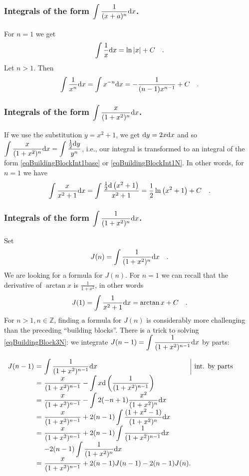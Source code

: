 \documentclass[12pt]{book}
\renewcommand{\Arctan}{\arctan}
\begin{document}
\subsubsection{Integrals of the form $\displaystyle\int \frac{1}{(x+a)^n}{\normalfont \text{d}} x$.}
For $n=1$ we get
\begin{equation}\label{eqBuildingBlockInt1base}
\int \frac{1}{x}{\normalfont \text{d}} x=\ln |x| +C\quad .
\end{equation}
Let $n> 1$. Then
\begin{equation}\label{eqBuildingBlockInt1N}
\int \frac{1}{x^n}{\normalfont \text{d}} x=\int x^{-n}{\normalfont \text{d}} x= -\frac{1}{(n-1)x^{n-1}}+C \quad .
\end{equation}
\subsubsection{Integrals of the form $\displaystyle\int \frac{x}{(1+x ^2)^n} {\normalfont \text{d}} x $.}
If we use the substitution $y=x^2+1$, we get ${\normalfont \text{d}} y=2x{\normalfont \text{d}} x $ and so $\displaystyle \int \frac{x}{(1+x ^2)^n} {\normalfont \text{d}} x = \displaystyle\int \frac{\frac12 {\normalfont \text{d}} y}{y^n} $, i.e., our integral is transformed to an integral of the form \eqref{eqBuildingBlockInt1base} or  \eqref{eqBuildingBlockInt1N}. In other words, for $n=1$ we have
\[
\int \frac{x}{x^2+1}{\normalfont \text{d}} x= \int \frac{\frac{1}2 {\normalfont \text{d}}\left(x^2+1\right)}{x^2+1}= \frac{1}{2}\ln \left(x^2+1\right) +C\quad .
\]
\subsubsection {Integrals of the form $\displaystyle\int \frac{1}{(1+x ^2)^n} {\normalfont \text{d}} x $.}
Set 
\begin{equation}\label{eqBuildingBlock3N}
J(n)=\int \frac{1}{(1+x ^2)^n}{\normalfont \text{d}} x\quad .
\end{equation}
We are looking for a formula for $J(n)$. For $n=1$ we can recall that the derivative of $\Arctan x$ is $\displaystyle\frac{1}{1+x^2}$, in other words
\[
J(1)=\int \frac{1}{x^2+1}\diff x= \Arctan x+C\quad .
\]
For $n>1, n\in \mathbb Z$, finding a formula for $J(n)$ is considerably more challenging than the preceding ``building blocks''. There is a trick to solving \eqref{eqBuildingBlock3N}: we integrate $\displaystyle J(n-1)= \int \frac{1}{(1+x ^2)^{n-1}}{\normalfont \text{d}} x$ by parts:

$
\begin{array}{r@{~}c@{~}l@{}l@{}|l}
J(n-1)&=&\displaystyle \int \frac{1}{(1+x ^2)^{n-1}}\diff x &&\text{int. by parts}\\
&=&\displaystyle \frac{x}{(1+x ^2)^{n-1}}-\int x \diff \left(\frac{1}{(1+x ^2)^{ n - 1 } } \right)\\
&=&\displaystyle\frac{x}{(1+x ^2)^{n-1}}- \int 2(-n+1)\frac{x^2}{(1+x^2)^n}\diff x\\
&=&\displaystyle\frac{x}{(1+x ^2)^{n-1}}+2(n-1) \int \frac{(1+x^2-1)}{(1+x^2)^n}\diff x\\
&=&\displaystyle\frac{x}{(1+x ^2)^{n-1}} +2(n-1)\int \frac{1}{(1+x^2)^{n-1}}\diff x \\&&\displaystyle -2(n-1) \int \frac{1}{(1+x^2)^n}\diff x\\
&=&\displaystyle  \frac{x}{(1+x ^2)^{n-1}} +2(n-1)J(n-1)-2(n-1)J(n).
\end{array}
$
\end{document}
